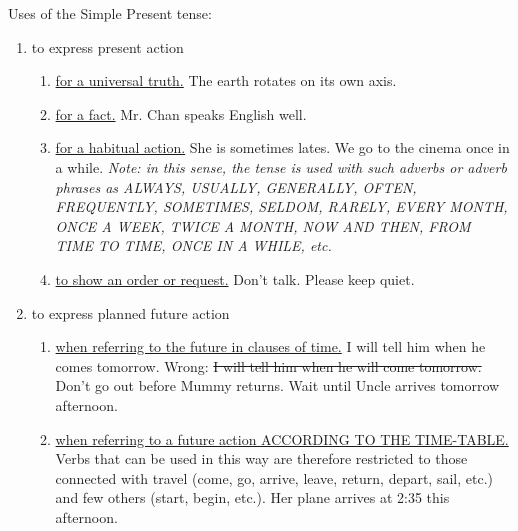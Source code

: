 Uses of the Simple Present tense:
\begin{enumerate}
    \item to express present action
        \begin{enumerate}
            \item \underline{for a universal truth.}
                \newline
                The earth rotates on its own axis.
            \item \underline{for a fact.}
                \newline
                Mr. Chan speaks English well.
            \item \underline{for a habitual action.}
                \newline
                She is sometimes lates.
                \newline
                We go to the cinema once in a while.
                \newline
                \textit{Note: in this sense, the tense is used with such adverbs
                or adverb phrases as ALWAYS, USUALLY, GENERALLY, OFTEN,
                FREQUENTLY, SOMETIMES, SELDOM, RARELY, EVERY MONTH, ONCE A WEEK,
                TWICE A MONTH, NOW AND THEN, FROM TIME TO TIME, ONCE IN A WHILE,
                etc.}
            \item \underline{to show an order or request.}
                \newline
                Don't talk.
                \newline
                Please keep quiet.
        \end{enumerate}
    \item to express planned future action
        \begin{enumerate}
            \item \underline{when referring to the future in clauses of time.}
                \newline
                I will tell him when he comes tomorrow.
                \newline
                Wrong: \st{I will tell him when he will come tomorrow.}
                \newline
                Don't go out before Mummy returns.
                \newline
                Wait until Uncle arrives tomorrow afternoon.
            \item \underline{when referring to a future action ACCORDING TO THE 
                TIME-TABLE.}
                \newline
                Verbs that can be used in this way are therefore restricted to
                those connected with travel (come, go, arrive, leave, return,
                depart, sail, etc.) and few others (start, begin, etc.).
                \newline
                Her plane arrives at 2:35 this afternoon.
        \end{enumerate}
\end{enumerate}

